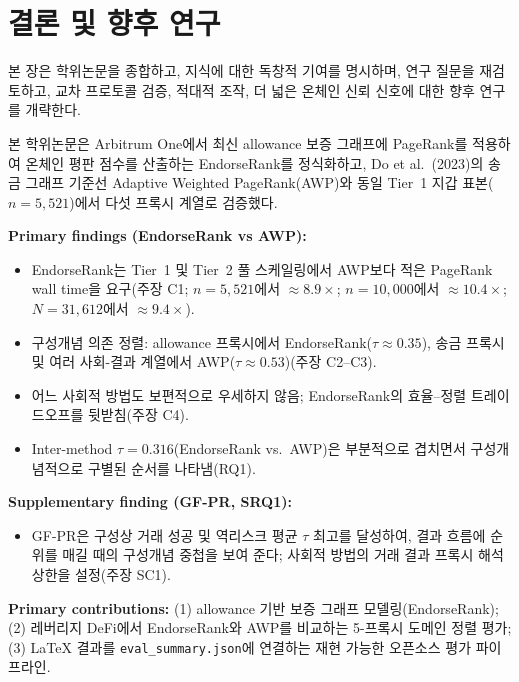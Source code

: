 
\chapter{결론 및 향후 연구}
\label{ch:conclusion}

본 장은 학위논문을 종합하고, 지식에 대한 독창적 기여를 명시하며, 연구 질문을 재검토하고, 교차 프로토콜 검증, 적대적 조작, 더 넓은 온체인 신뢰 신호에 대한 향후 연구를 개략한다.


본 학위논문은 Arbitrum One에서 최신 allowance 보증 그래프에 PageRank를 적용하여 온체인 평판 점수를 산출하는 EndorseRank를 정식화하고, Do et al.\ (2023)의 송금 그래프 기준선 Adaptive Weighted PageRank(AWP)와 동일 Tier~1 지갑 표본($n=5{,}521$)에서 다섯 프록시 계열로 검증했다.

\textbf{Primary findings (EndorseRank vs AWP):}

\begin{itemize}
\item EndorseRank는 Tier~1 및 Tier~2 풀 스케일링에서 AWP보다 적은 PageRank wall time을 요구(주장 C1; $n=5{,}521$에서 $\approx 8.9\times$; $n=10{,}000$에서 $\approx 10.4\times$; $N=31{,}612$에서 $\approx 9.4\times$).
\item 구성개념 의존 정렬: allowance 프록시에서 EndorseRank($\tau \approx 0.35$), 송금 프록시 및 여러 사회-결과 계열에서 AWP($\tau \approx 0.53$)(주장 C2--C3).
\item 어느 사회적 방법도 보편적으로 우세하지 않음; EndorseRank의 효율--정렬 트레이드오프를 뒷받침(주장 C4).
\item Inter-method $\tau = 0.316$(EndorseRank vs.\ AWP)은 부분적으로 겹치면서 구성개념적으로 구별된 순서를 나타냄(RQ1).
\end{itemize}

\textbf{Supplementary finding (GF-PR, SRQ1):}

\begin{itemize}
\item GF-PR은 구성상 거래 성공 및 역리스크 평균 $\tau$ 최고를 달성하여, 결과 흐름에 순위를 매길 때의 구성개념 중첩을 보여 준다; 사회적 방법의 거래 결과 프록시 해석 상한을 설정(주장 SC1).
\end{itemize}


\textbf{Primary contributions:} (1) allowance 기반 보증 그래프 모델링(EndorseRank); (2) 레버리지 DeFi에서 EndorseRank와 AWP를 비교하는 5-프록시 도메인 정렬 평가; (3) LaTeX 결과를 \texttt{eval\_summary.json}에 연결하는 재현 가능한 오픈소스 평가 파이프라인.

